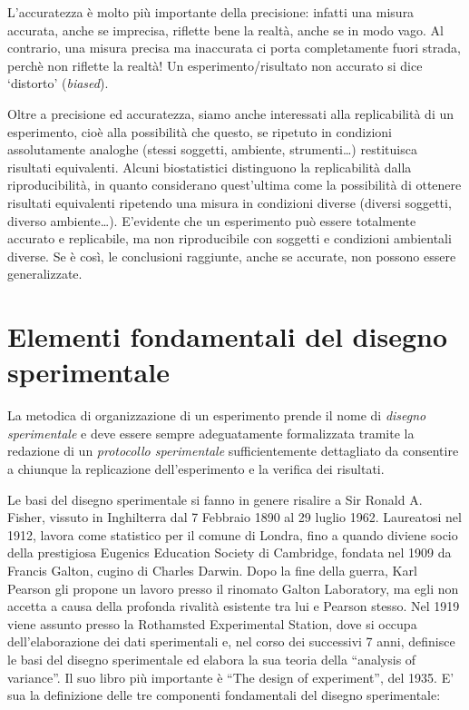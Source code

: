 \documentclass[a4paper,12pt,oneside]{book}
\begin{document}
L'accuratezza è molto più importante della precisione: infatti una
misura accurata, anche se imprecisa, riflette bene la realtà, anche se
in modo vago. Al contrario, una misura precisa ma inaccurata ci porta
completamente fuori strada, perchè non riflette la realtà! Un
esperimento/risultato non accurato si dice `distorto' (\emph{biased}).

Oltre a precisione ed accuratezza, siamo anche interessati alla
replicabilità di un esperimento, cioè alla possibilità che questo, se
ripetuto in condizioni assolutamente analoghe (stessi soggetti,
ambiente, strumenti\ldots{}) restituisca risultati equivalenti. Alcuni
biostatistici distinguono la replicabilità dalla riproducibilità, in
quanto considerano quest'ultima come la possibilità di ottenere
risultati equivalenti ripetendo una misura in condizioni diverse
(diversi soggetti, diverso ambiente\ldots{}). E'evidente che un
esperimento può essere totalmente accurato e replicabile, ma non
riproducibile con soggetti e condizioni ambientali diverse. Se è così,
le conclusioni raggiunte, anche se accurate, non possono essere
generalizzate.

\section{Elementi fondamentali del disegno
sperimentale}\label{elementi-fondamentali-del-disegno-sperimentale}

La metodica di organizzazione di un esperimento prende il nome di
\emph{disegno sperimentale} e deve essere sempre adeguatamente
formalizzata tramite la redazione di un \emph{protocollo sperimentale}
sufficientemente dettagliato da consentire a chiunque la replicazione
dell'esperimento e la verifica dei risultati.

Le basi del disegno sperimentale si fanno in genere risalire a Sir
Ronald A. Fisher, vissuto in Inghilterra dal 7 Febbraio 1890 al 29
luglio 1962. Laureatosi nel 1912, lavora come statistico per il comune
di Londra, fino a quando diviene socio della prestigiosa Eugenics
Education Society di Cambridge, fondata nel 1909 da Francis Galton,
cugino di Charles Darwin. Dopo la fine della guerra, Karl Pearson gli
propone un lavoro presso il rinomato Galton Laboratory, ma egli non
accetta a causa della profonda rivalità esistente tra lui e Pearson
stesso. Nel 1919 viene assunto presso la Rothamsted Experimental
Station, dove si occupa dell'elaborazione dei dati sperimentali e, nel
corso dei successivi 7 anni, definisce le basi del disegno sperimentale
ed elabora la sua teoria della ``analysis of variance''. Il suo libro
più importante è ``The design of experiment'', del 1935. E' sua la
definizione delle tre componenti fondamentali del disegno sperimentale:
\end{document}
